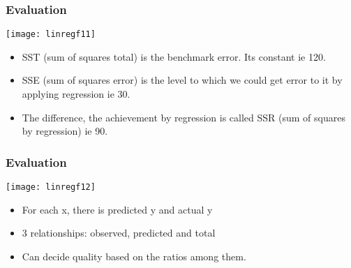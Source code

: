 \begin{frame}[fragile]\frametitle{Evaluation}
\begin{center}
\texttt{[image: linregf11]}
\end{center}
\begin{itemize}
\item SST (sum of squares total) is the benchmark error. Its constant ie 120.
\item SSE (sum of squares error) is the level to which we could get error to it by applying regression ie 30.
\item The difference, the achievement by regression is called SSR (sum of squares by regression) ie 90.
\end{itemize}
\end{frame}

\begin{frame}[fragile]\frametitle{Evaluation}
\begin{center}
\texttt{[image: linregf12]}
\end{center}

\begin{itemize}
\item For each x, there is predicted y and actual y
\item 3 relationships: observed, predicted and total
\item Can decide quality based on the ratios among them.
\end{itemize}
\end{frame}

